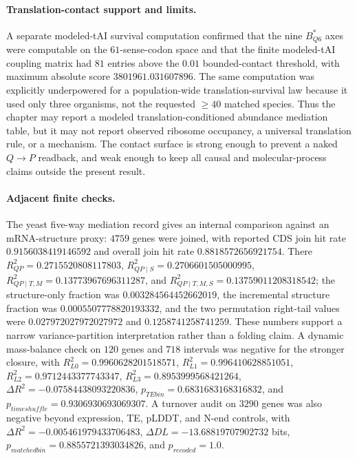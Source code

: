 \paragraph{Translation-contact support and limits.}
A separate modeled-tAI survival computation confirmed that the nine $B^{*}_{Q6}$ axes were computable on the $61$-sense-codon space and that the finite modeled-tAI coupling matrix had $81$ entries above the $0.01$ bounded-contact threshold, with maximum absolute score $3801961.031607896$.  The same computation was explicitly underpowered for a population-wide translation-survival law because it used only three organisms, not the requested $\geq 40$ matched species.  Thus the chapter may report a modeled translation-conditioned abundance mediation table, but it may not report observed ribosome occupancy, a universal translation rule, or a mechanism.  The contact surface is strong enough to prevent a naked $Q\to P$ readback, and weak enough to keep all causal and molecular-process claims outside the present result.

\paragraph{Adjacent finite checks.}
The yeast five-way mediation record gives an internal comparison against an mRNA-structure proxy: $4759$ genes were joined, with reported CDS join hit rate $0.9156038419146592$ and overall join hit rate $0.8818572656921754$.  There $R^2_{QP}=0.2715520808117803$, $R^2_{QP\mid S}=0.2706601505000995$, $R^2_{QP\mid T,M}=0.13773967696311287$, and $R^2_{QP\mid T,M,S}=0.13759011208318542$; the structure-only fraction was $0.003284564452662019$, the incremental structure fraction was $0.0005507778820193332$, and the two permutation right-tail values were $0.027972027972027972$ and $0.1258741258741259$.  These numbers support a narrow variance-partition interpretation rather than a folding claim.  A dynamic mass-balance check on $120$ genes and $718$ intervals was negative for the stronger closure, with $R^2_{L0}=0.9960628201518571$, $R^2_{L1}=0.996410628851051$, $R^2_{L2}=0.9712443377743347$, $R^2_{L3}=0.8953999568421264$, $\Delta R^2=-0.07584438093220836$, $p_{TEbin}=0.6831683168316832$, and $p_{timeshuffle}=0.9306930693069307$.  A turnover audit on $3290$ genes was also negative beyond expression, TE, pLDDT, and N-end controls, with $\Delta R^2=-0.005461979433706483$, $\Delta DL=-13.68819707902732$ bits, $p_{matchedbin}=0.8855721393034826$, and $p_{recoded}=1.0$.

